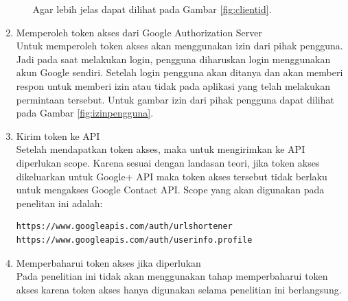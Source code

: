 \begin{enumerate}
\begin{enumerate}
\begin{lstlisting}
\end{lstlisting}
Agar lebih jelas dapat dilihat pada Gambar \ref{fig:clientid}.
    \end{enumerate}
\item Memperoleh token akses dari Google Authorization Server\\
Untuk memperoleh token akses akan menggunakan izin dari pihak pengguna. Jadi pada saat melakukan login, pengguna diharuskan login menggunakan akun Google sendiri. Setelah login pengguna akan ditanya dan akan memberi respon untuk memberi izin atau tidak pada aplikasi yang telah melakukan permintaan tersebut. Untuk gambar izin dari pihak pengguna dapat dilihat pada Gambar \ref{fig:izinpengguna}.
\item Kirim token ke API\\
Setelah mendapatkan token akses, maka untuk mengirimkan ke API diperlukan scope. Karena sesuai dengan landasan teori, jika token akses dikeluarkan untuk Google+ API maka token akses tersebut tidak berlaku untuk mengakses Google Contact API. Scope yang akan digunakan pada penelitan ini adalah:
\begin{lstlisting}
https://www.googleapis.com/auth/urlshortener
https://www.googleapis.com/auth/userinfo.profile
\end{lstlisting}
\item Memperbaharui token akses jika diperlukan\\
Pada penelitian ini tidak akan menggunakan tahap memperbaharui token akses karena token akses hanya digunakan selama penelitian ini berlangsung.
\end{enumerate}

